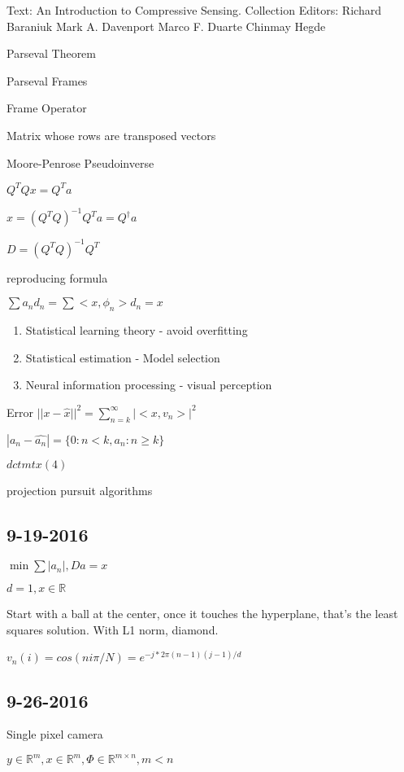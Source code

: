 \documentclass[12pt,letterpaper]{report}
\author{Michael Kummer}
\begin{document}
Text: An Introduction to Compressive Sensing.
Collection Editors:
Richard Baraniuk
Mark A. Davenport
Marco F. Duarte
Chinmay Hegde

Parseval Theorem

Parseval Frames

Frame Operator

	Matrix whose rows are transposed vectors

Moore-Penrose Pseudoinverse

	$Q^TQx = Q^Ta$

	$x = (Q^TQ)^{-1}Q^Ta = Q^\dagger a$

$D = (Q^TQ)^{-1}Q^T$

reproducing formula

$\sum a_n d_n = \sum <x, \phi_n>d_n = x$

\begin{enumerate}
\item Statistical learning theory  - avoid overfitting
\item Statistical estimation - Model selection
\item Neural information processing - visual perception
\end{enumerate}

Error $||x - \hat{x}||^2 = \sum^\infty_{n=k}|<x, v_n>|^2$

$|a_n - \hat{a_n}| = \{ 0 : n < k, a_n : n \geq k\}$

$dctmtx(4)$

projection pursuit algorithms


\subsection*{9-19-2016}

$\min \sum |a_n|, Da = x$

$d = 1, x \in \mathbb{R}$

Start with a ball at the center, once it touches the hyperplane, that's the least squares solution.  With L1 norm, diamond.

$v_n(i) = cos(ni\pi /N) = e^{-j*2\pi (n-1)(j-1)/d}$

\subsection*{9-26-2016}

Single pixel camera

$y \in \mathbb{R}^m, x \in \mathbb{R}^m, \Phi \in \mathbb{R}^{m \times n}, m < n$
\end{document}
